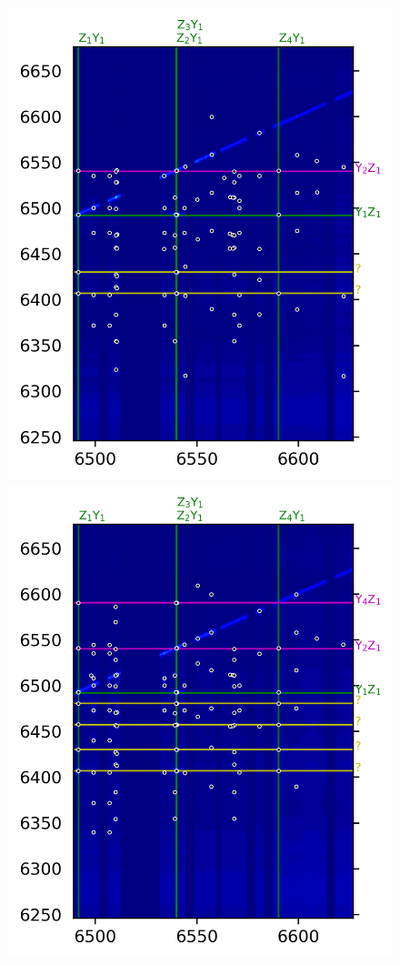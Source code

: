 \documentclass[12pt]{report}
\begin{document}
\begin{figure}[b]
{    \includegraphics[scale=0.97]{JinD_site3_32K}\\
    \includegraphics[scale=0.97]{JinD_site3_60K}\hfill
}
\end{figure}
\end{document}
